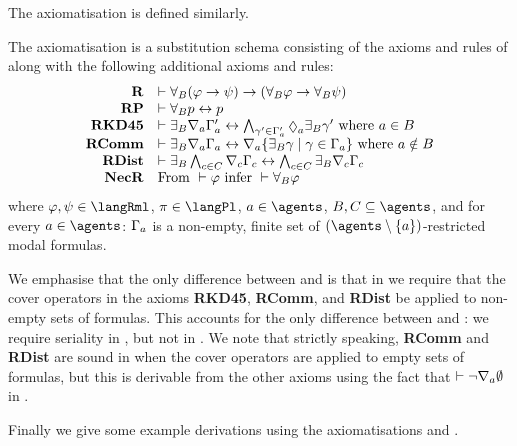 \pagebreak

The axiomatisation \axiomRmlKD{} is defined similarly.

\begin{definition}
The axiomatisation \axiomRmlKD{} is a substitution schema consisting of the axioms and rules of \axiomKD{} along with the following additional axioms and rules:
$$
\begin{array}{rl}
    {\bf R} & \proves \allrefsBs (\phi \implies \psi) \implies (\allrefsBs \phi \implies \allrefsBs \psi)\\
    {\bf RP} & \proves \allrefsBs \atomP \iff \atomP\\
    {\bf RKD45} & \proves \somerefsBs \coversA \Gamma'_\agentA \iff \bigwedge_{\gamma' \in \Gamma'_\agentA} \possibleA \somerefsBs \gamma' \text{ where } \agentA \in \agentsB\\
    {\bf RComm} & \proves \somerefsBs \coversA \Gamma_\agentA \iff \coversA \{\somerefsBs \gamma \mid \gamma \in \Gamma_\agentA\} \text{ where } \agentA \notin \agentsB\\
    {\bf RDist} & \proves \somerefsBs \bigwedge_{\agentC \in \agentsC} \coversC \Gamma_\agentC \iff \bigwedge_{\agentC \in \agentsC} \somerefsBs \coversC \Gamma_\agentC\\
    {\bf NecR} & \text{From } \proves \phi \text{ infer } \proves \allrefsBs \phi
\end{array}
$$
where $\phi, \psi \in \langRml$, $\pi \in \langPl$, $\agentA \in \agents$, $\agentsB, \agentsC \subseteq \agents$, and for every $\agentA \in \agents$: $\Gamma_a$ is a non-empty, finite set of $(\agents \setminus \{\agentA\})$-restricted modal formulas.
\end{definition}

We emphasise that the only difference between \axiomRmlKFF{} and \axiomRmlKD{} is that in \axiomRmlKD{} we require that the cover operators in the axioms {\bf RKD45}, {\bf RComm}, and {\bf RDist} be applied to non-empty sets of formulas.
This accounts for the only difference between \classKFF{} and \classKD{}: we require seriality in \classKD{}, but not in \classKFF{}.
We note that strictly speaking, {\bf RComm} and {\bf RDist} are sound in \logicRmlKD{} when the cover operators are applied to empty sets of formulas, but this is derivable from the other axioms using the fact that $\vdash \lnot \nabla_{a} \emptyset$ in \axiomKFF{}.

\pagebreak

Finally we give some example derivations using the axiomatisations \axiomRmlKFF{} and \axiomRmlKD{}.

